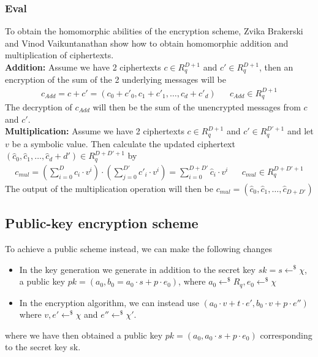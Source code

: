 \documentclass[../main.tex]{subfiles}
\begin{document}
\subsubsection{Eval}
To obtain the homomorphic abilities of the encryption scheme, Zvika Brakerski and Vinod Vaikuntanathan show
how to obtain homomorphic addition and multiplication of ciphertexts.
\\[2mm]
\textbf{Addition:} Assume we have 2 ciphertexts $c \in R_q^{D+1}$ and $c' \in R_q^{D+1}$, then an encryption
of the sum of the 2 underlying messages will be
\begin{align*}
    c_{Add} = c + c' = (c_0 + c'_0, c_1 + c'_1, \dots , c_d + c'_d) &  & c_{Add} \in R_q^{D + 1}
\end{align*}
The decryption of $c_{Add}$ will then be the sum of the unencrypted messages from $c$ and $c'$.
\\[2mm]
\textbf{Multiplication:} Assume we have 2 ciphertexts $c \in R_q^{D+1}$ and $c' \in R_q^{D'+1}$ and let $v$ be a symbolic value.
Then calculate the updated ciphertext
\\
$(\hat{c}_0, \hat{c}_1, \dots, \hat{c}_d+d') \in R_q^{D + D' + 1}$ by
\begin{align*}
    c_{mul} = (\sum_{i=0}^D c_i \cdot v^i) \cdot
    (\sum_{j=0}^{D'} c'_i \cdot v^i) =
    \sum_{i=0}^{D+D'} \hat{c}_i \cdot v^i
     &  & c_{mul} \in R_q^{D+D'+1}
\end{align*}
The output of the multiplication operation will then be $c_{mul} = (\hat{c}_0, \hat{c}_1, \dots, \hat{c}_{D+D'})$

\subsection{Public-key encryption scheme}
To achieve a public scheme instead, we can make the following changes
\begin{itemize}
    \item In the key generation we generate in addition to the secret key $sk = s \leftarrow^{\$} \chi$, a public key
        $pk = (a_0 , b_0 = a_0 \cdot s + p \cdot e_0)$, where $a_0 \leftarrow^{\$} R_q, e_0 \leftarrow^{\$} \chi$
    \item In the encryption algorithm, we can instead use
        $(a_0 \cdot v + t \cdot e', b_0 \cdot v + p \cdot e'')$ where
        $v, e' \leftarrow^{\$} \chi$ and $e'' \leftarrow^{\$} \chi '$. %
\end{itemize} 
where we have then obtained a public key $pk = (a_0, a_0 \cdot s + p \cdot e_0)$
corresponding to the secret key sk.
\end{document}
